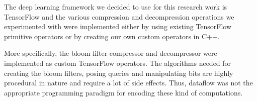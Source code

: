     The deep learning framework we decided to use for this research work is TensorFlow and the various compression and decompression operations we experimented with were implemented either by using existing TensorFlow primitive operators or by creating our own custom operators in C++.

    More specifically, the bloom filter compressor and decompressor were implemented as custom TensorFlow operators.
    The algorithms needed for creating the bloom filters, posing queries and manipulating bits are highly procedural in nature and require a lot of side effects. Thus, dataflow was not the appropriate programming paradigm for encoding these kind of computations.
    

